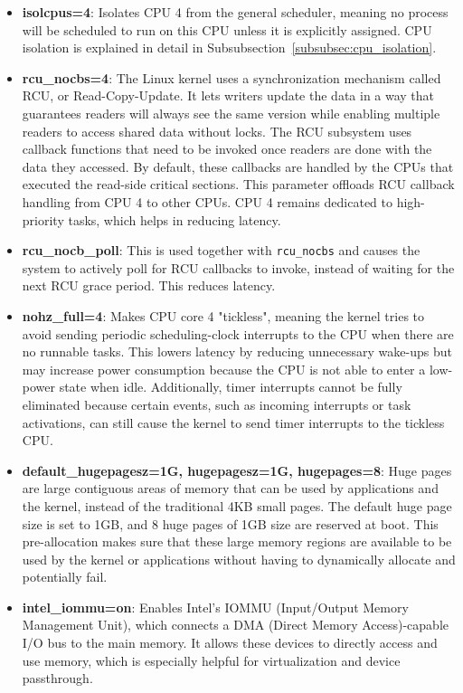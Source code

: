 \documentclass[MMR,Master,english]{style/twbook}
\begin{document}
\begin{itemize}
	\item \textbf{isolcpus=4}: Isolates CPU 4 from the general scheduler, meaning no process will be scheduled to run on this CPU unless it is explicitly assigned. CPU isolation is explained in detail in Subsubsection~\ref{subsubsec:cpu_isolation}.
	\item \textbf{rcu\_nocbs=4}: The Linux kernel uses a synchronization mechanism called RCU, or Read-Copy-Update. It lets writers update the data in a way that guarantees readers will always see the same version while enabling multiple readers to access shared data without locks. The RCU subsystem uses callback functions that need to be invoked once readers are done with the data they accessed. By default, these callbacks are handled by the CPUs that executed the read-side critical sections. This parameter offloads RCU callback handling from CPU 4 to other CPUs. CPU 4 remains dedicated to high-priority tasks, which helps in reducing latency.
	\item \textbf{rcu\_nocb\_poll}: This is used together with \texttt{rcu\_nocbs} and causes the system to actively poll for RCU callbacks to invoke, instead of waiting for the next RCU grace period. This reduces latency.
	\item \textbf{nohz\_full=4}: Makes CPU core 4 "tickless", meaning the kernel tries to avoid sending periodic scheduling-clock interrupts to the CPU when there are no runnable tasks. This lowers latency by reducing unnecessary wake-ups but may increase power consumption because the CPU is not able to enter a low-power state when idle. Additionally, timer interrupts cannot be fully eliminated because certain events, such as incoming interrupts or task activations, can still cause the kernel to send timer interrupts to the tickless CPU.
	\item \textbf{default\_hugepagesz=1G, hugepagesz=1G, hugepages=8}: Huge pages are large contiguous areas of memory that can be used by applications and the kernel, instead of the traditional 4KB small pages. The default huge page size is set to 1GB, and 8 huge pages of 1GB size are reserved at boot. This pre-allocation makes sure that these large memory regions are available to be used by the kernel or applications without having to dynamically allocate and potentially fail.
	\item \textbf{intel\_iommu=on}: Enables Intel's IOMMU (Input/Output Memory Management Unit), which connects a DMA (Direct Memory Access)-capable I/O bus to the main memory. It allows these devices to directly access and use memory, which is especially helpful for virtualization and device passthrough. 

\end{itemize}
\end{document}
